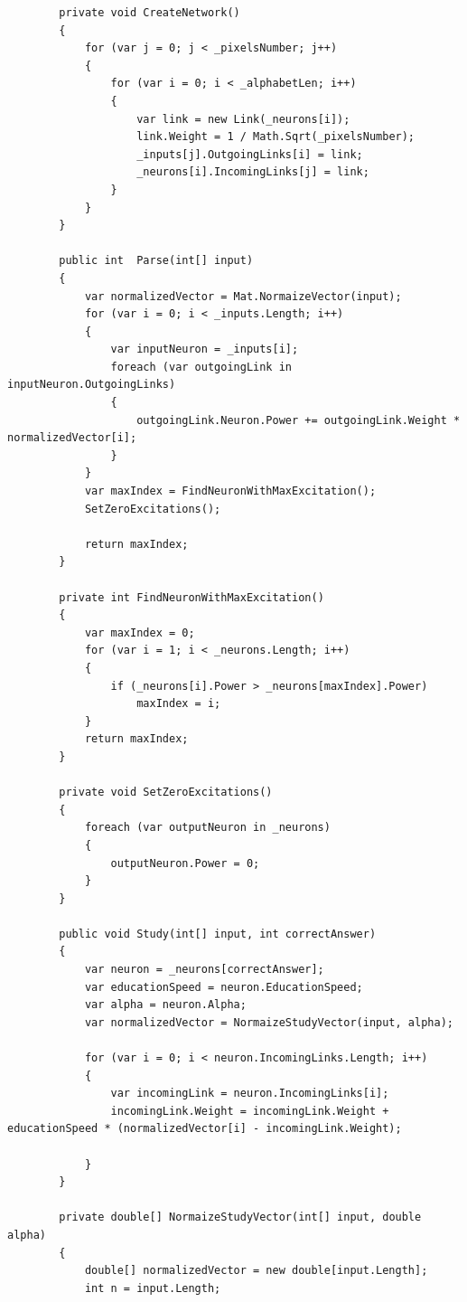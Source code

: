 \documentclass[14pt,a4paper]{extreport}
\begin{document}
\begin{verbatim}
        private void CreateNetwork()
        {
            for (var j = 0; j < _pixelsNumber; j++)
            {
                for (var i = 0; i < _alphabetLen; i++)
                {
                    var link = new Link(_neurons[i]);
                    link.Weight = 1 / Math.Sqrt(_pixelsNumber);
                    _inputs[j].OutgoingLinks[i] = link;
                    _neurons[i].IncomingLinks[j] = link;
                }
            }
        }

        public int  Parse(int[] input)
        {
            var normalizedVector = Mat.NormaizeVector(input);
            for (var i = 0; i < _inputs.Length; i++)
            {
                var inputNeuron = _inputs[i];
                foreach (var outgoingLink in inputNeuron.OutgoingLinks)
                {
                    outgoingLink.Neuron.Power += outgoingLink.Weight * normalizedVector[i];
                }
            }
            var maxIndex = FindNeuronWithMaxExcitation();
            SetZeroExcitations();

            return maxIndex;
        }

        private int FindNeuronWithMaxExcitation()
        {
            var maxIndex = 0;
            for (var i = 1; i < _neurons.Length; i++)
            {
                if (_neurons[i].Power > _neurons[maxIndex].Power)
                    maxIndex = i;
            }
            return maxIndex;
        }

        private void SetZeroExcitations()
        {
            foreach (var outputNeuron in _neurons)
            {
                outputNeuron.Power = 0;
            }
        }

        public void Study(int[] input, int correctAnswer)
        {
            var neuron = _neurons[correctAnswer];
            var educationSpeed = neuron.EducationSpeed;
            var alpha = neuron.Alpha;
            var normalizedVector = NormaizeStudyVector(input, alpha);

            for (var i = 0; i < neuron.IncomingLinks.Length; i++)
            {
                var incomingLink = neuron.IncomingLinks[i];
                incomingLink.Weight = incomingLink.Weight + educationSpeed * (normalizedVector[i] - incomingLink.Weight);

            }
        }

        private double[] NormaizeStudyVector(int[] input, double alpha)
        {
            double[] normalizedVector = new double[input.Length];
            int n = input.Length;


\end{verbatim}
\end{document}

